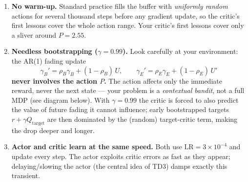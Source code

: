 \documentclass[11pt]{article}
\begin{document}
\begin{enumerate}
\item \textbf{No warm-up.} Standard practice fills the buffer with \emph{uniformly
      random} actions for several thousand steps before any gradient update, so the
      critic's first lessons cover the whole action range. Your critic's first
      lessons cover only a sliver around $P=2.55$.
\item \textbf{Needless bootstrapping ($\gamma=0.99$).} Look carefully at your
      environment: the AR(1) fading update
      \[
      \gamma_B' = \rho_B\gamma_B + (1-\rho_B)\,U, \qquad
      \gamma_E' = \rho_E\gamma_E + (1-\rho_E)\,U'
      \]
      \textbf{never involves the action $P$.} The action affects only the immediate
      reward, never the next state --- your problem is a \emph{contextual bandit},
      not a full MDP (see diagram below). With $\gamma=0.99$ the critic is forced to
      also predict the value of future fading it cannot influence; early
      bootstrapped targets $r+\gamma Q_{\text{target}}$ are then dominated by the
      (random) target-critic term, making the drop deeper and longer.
\item \textbf{Actor and critic learn at the same speed.} Both use
      $\text{LR}=3\times10^{-4}$ and update every step. The actor exploits critic
      errors as fast as they appear; delaying/slowing the actor (the central idea of
      TD3) damps exactly this transient.
\end{enumerate}

\begin{center}
\end{center}
\end{document}

